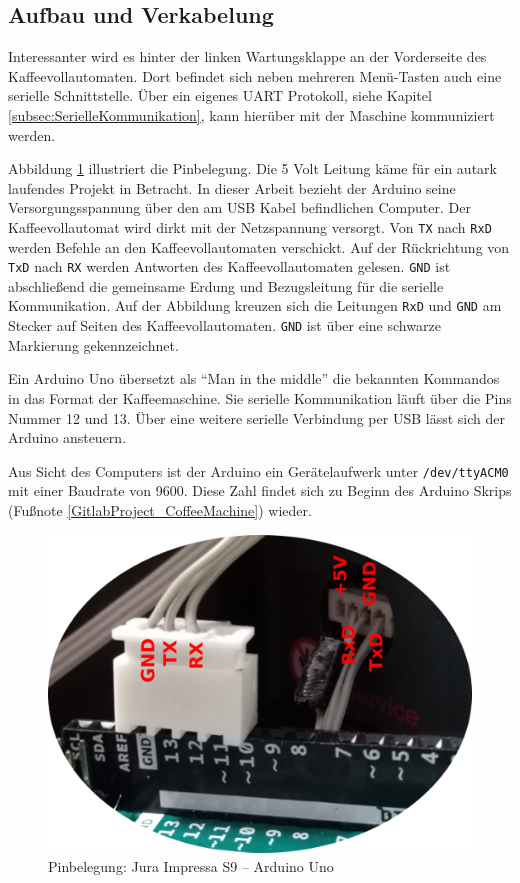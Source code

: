 \subsection{Aufbau und Verkabelung}
Interessanter wird es hinter der linken Wartungsklappe an der Vorderseite des Kaffeevollautomaten.
Dort befindet sich neben mehreren Menü-Tasten auch eine serielle Schnittstelle.
Über ein eigenes \ac{UART} Protokoll, siehe Kapitel \ref{subsec:SerielleKommunikation}, kann hierüber mit der Maschine kommuniziert werden.

Abbildung \ref{fig:KaffeevollautomatPins} illustriert die Pinbelegung.
Die 5 Volt Leitung käme für ein autark laufendes Projekt in Betracht.
In dieser Arbeit bezieht der Arduino seine Versorgungsspannung über den am USB Kabel befindlichen Computer.
Der Kaffeevollautomat wird dirkt mit der Netzspannung versorgt.
Von \texttt{TX} nach \texttt{RxD} werden Befehle an den Kaffeevollautomaten verschickt.
Auf der Rückrichtung von \texttt{TxD} nach \texttt{RX} werden Antworten des Kaffeevollautomaten gelesen.
\texttt{GND} ist abschließend die gemeinsame Erdung und Bezugsleitung für die serielle Kommunikation.
Auf der Abbildung kreuzen sich die Leitungen \texttt{RxD} und \texttt{GND} am Stecker auf Seiten des Kaffeevollautomaten.
\texttt{GND} ist über eine schwarze Markierung gekennzeichnet.

Ein Arduino Uno übersetzt als "`Man in the middle"' die bekannten Kommandos in das Format der Kaffeemaschine.
Sie serielle Kommunikation läuft über die Pins Nummer 12 und 13.
Über eine weitere serielle Verbindung per USB lässt sich der Arduino ansteuern.

Aus Sicht des Computers ist der Arduino ein Gerätelaufwerk unter \texttt{/dev/ttyACM0} mit einer Baudrate von 9600.
Diese Zahl findet sich zu Beginn des Arduino Skrips (Fußnote \ref{GitlabProject_CoffeeMachine}) wieder.

\begin{figure}
  \begin{center}
    \includegraphics[scale=0.3]{images/Jura-Arduino-Pins-beschriftet-small}
    \caption{Pinbelegung: Jura Impressa S9 -- Arduino Uno}
    \label{fig:KaffeevollautomatPins}
  \end{center}
\end{figure}

